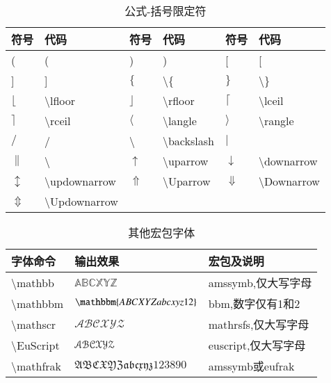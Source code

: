 \documentclass[UTF8,fontset=ubuntu]{ctexart}
\begin{document}
\begin{table}[H]
\begin{minipage}{\textwidth}
\begin{tabular}{l l l l l l}
	\hline
	符号 & 代码 & 符号 & 代码 & 符号 & 代码\\
	\hline
	( & ( & ) & ) & [ & [\\
	] & ] & $\{$ & \textbackslash \{ & $\}$ & \textbackslash \}\\
	$\lfloor$ & \textbackslash lfloor & $\rfloor$ & \textbackslash rfloor & $\lceil$ & \textbackslash lceil\\
	$\rceil$ & \textbackslash rceil & $\langle$ & \textbackslash langle & $\rangle$ & \textbackslash rangle\\
	$/$ & / & \textbackslash & \textbackslash backslash & $|$ & \textbar\\
	$\|$ & \textbackslash\textbar & $\uparrow$ & \textbackslash uparrow & $\downarrow$ & \textbackslash downarrow\\
	$\updownarrow$ & \textbackslash updownarrow & $\Uparrow$ & \textbackslash Uparrow & $\Downarrow$ & \textbackslash Downarrow\\
	$\Updownarrow$ & \textbackslash  Updownarrow\\
	\hline
\end{tabular}
\end{minipage}
\caption{公式-括号限定符}
\end{table}

\begin{table}[H]
\begin{minipage}{\textwidth}
\begin{tabular}{l l l}
	\hline
	字体命令 & 输出效果 & 宏包及说明\\\hline
	\textbackslash mathbb & $\mathbb{ABCXYZ}$ & amssymb,仅大写字母\\
	\textbackslash  mathbbm & $\mathbbm{ABCXYZabcxyz12}$ & bbm,数字仅有1和2\\
	\textbackslash  mathscr & $\mathscr{ABCXYZ}$ & mathrsfs,仅大写字母\\
	\textbackslash  EuScript & $\EuScript{ABCXYZ}$ & euscript,仅大写字母\footnotemark[1]\\
	\textbackslash  mathfrak & $\mathfrak{ABCXYZabcxyz123890}$ & amssymb或eufrak\\\hline
\end{tabular}
\end{minipage}
\caption{其他宏包字体}
\end{table}
\end{document}
